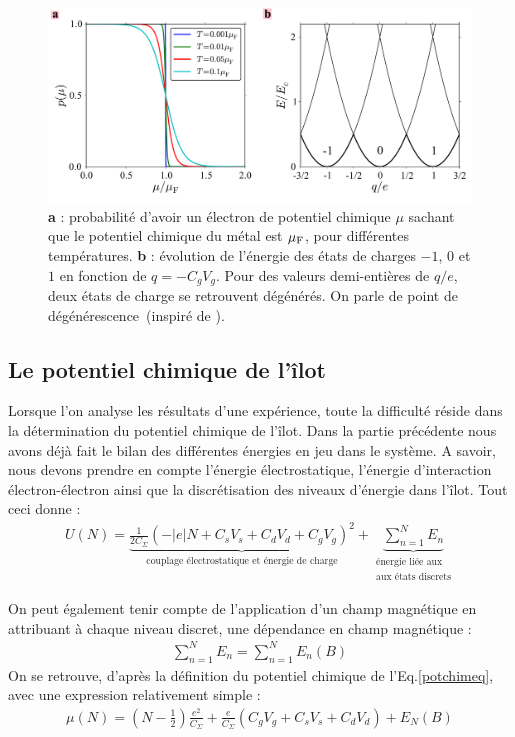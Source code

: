 \begin{figure}
\centering \includegraphics[scale=0.45]{Annexe2/figure2/figure2.pdf} 
\caption{ \textbf{a} : probabilité d'avoir un électron de potentiel chimique $\mu$ sachant que le potentiel chimique du métal est $\mu_{\rm{F}}$, pour différentes températures. \textbf{b} : évolution de l'énergie des états de charges $-1$, $0$ et $1$ en fonction de $q = -C_gV_g$. Pour des valeurs demi-entières de $q/e$, deux états de charge se retrouvent dégénérés. On parle de point de dégénérescence~(inspiré de \cite{Nazarov2009}).}
\label{distrib_fermi}
\end{figure}



\subsection{Le potentiel chimique de l'\^ilot}
Lorsque l'on analyse les résultats d'une expérience, toute la difficulté réside dans la détermination du potentiel chimique de l'\^ilot. Dans la partie précédente nous avons déjà fait le bilan des différentes énergies en jeu dans le système. A savoir, nous devons prendre en compte l'énergie électrostatique, l'énergie d'interaction électron-électron ainsi que la discrétisation des niveaux d'énergie dans l'\^ilot. Tout ceci donne :
\begin{eqnarray}
U(N) = \underbrace{\frac{1}{2C_{\Sigma}} (-|e|N + C_sV_s + C_dV_d + C_gV_g)^2}_{\text{couplage électrostatique et énergie de charge}}
+ 
\underbrace{\sum_{n=1}^{N} E_n}_{\substack{\text{énergie liée aux} \\\text{aux états discrets}}}
\end{eqnarray}

On peut également tenir compte de l'application d'un champ magnétique en attribuant à chaque niveau discret, une dépendance en champ magnétique :
\begin{eqnarray}
\sum_{n=1}^N E_n = \sum_{n=1}^N E_n(B) \nonumber
\end{eqnarray}
On se retrouve, d'après la définition du potentiel chimique de l'Eq.\ref{potchimeq}, avec une expression relativement simple :
\begin{eqnarray}
\mu(N) = (N-\frac{1}{2})\frac{e^2}{C_{\Sigma}}
+ 
\frac{e}{C_{\Sigma}}(C_gV_g + C_sV_s + C_dV_d)
+
E_N(B)
\end{eqnarray}

